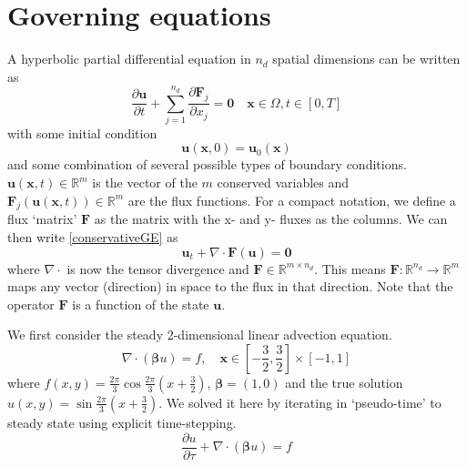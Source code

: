 \documentclass[11pt]{article}
\let\bld\boldsymbol
\begin{document}
\section{Governing equations}

A hyperbolic partial differential equation in $n_d$ spatial dimensions can be written as
\begin{equation}
\frac{\partial \bld{u}}{\partial t} + \sum_{j=1}^{n_d} \frac{\partial \bld{F}_j}{\partial x_j} = \bld{0} \quad \bld{x} \in \Omega, t \in [0,T]
\label{conservativeGE}
\end{equation}
with some initial condition
\begin{equation}
\bld{u}(\bld{x},0) = \bld{u}_0(\bld{x})
\end{equation}
and some combination of several possible types of boundary conditions.
$\bld{u}(\bld{x},t) \in \mathbb{R}^m$ is the vector of the $m$ conserved variables and $\bld{F}_j(\bld{u}(\bld{x},t)) \in \mathbb{R}^m$ are the flux functions. For a compact notation, we define a flux `matrix' $\bld{F}$ as the matrix with the x- and y- fluxes as the columns. We can then write \eqref{conservativeGE} as
\begin{equation}
\bld{u}_t + \nabla\cdot\bld{F}(\bld{u}) = \bld{0}
\label{conservativetensorGE}
\end{equation}
where $\nabla\cdot$ is now the tensor divergence and $\bld{F} \in \mathbb{R}^{m\times n_d}$. This means $\bld{F}:\mathbb{R}^{n_d}\rightarrow \mathbb{R}^m$ maps any vector (direction) in space to the flux in that direction. Note that the operator $\bld{F}$ is a function of the state $\bld{u}$.

We first consider the steady 2-dimensional linear advection equation.
\begin{equation}
\nabla\cdot(\bld{\beta}u) = f, \quad \bld{x} \in [-\frac32,\frac32]\times[-1,1]
\end{equation}
where $f(x,y) = \frac{2\pi}{3}\cos\frac{2\pi}{3}(x+\frac32)$, $\bld{\beta} = (1,0)$ and the true solution $u(x,y) = \sin\frac{2\pi}{3}(x+\frac32)$. We solved it here by iterating in `pseudo-time' to steady state using explicit time-stepping.
\begin{equation}
\frac{\partial u}{\partial \tau} + \nabla\cdot(\bld{\beta}u) = f
\end{equation}
\end{document}
